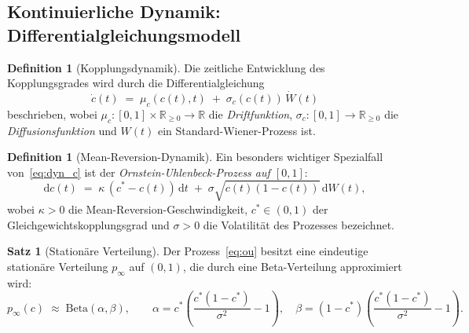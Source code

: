 \documentclass[a4paper, 12pt, twoside, openright]{report}
\theoremstyle{definition}
\newtheorem{definition}[theorem]{Definition}
\theoremstyle{definition}
\newtheorem{satz}{Satz}[chapter]
\begin{document}
\subsection{Kontinuierliche Dynamik: Differentialgleichungsmodell}

\begin{definition}[Kopplungsdynamik]
\label{def:kopplungsDyn}
    Die zeitliche Entwicklung des Kopplungsgrades wird durch die
    Differentialgleichung
    \begin{equation}
    \label{eq:dyn_c}
        \dot{c}(t) \;=\; \mu_c(c(t), t) \;+\; \sigma_c(c(t))\,\dot{W}(t)
    \end{equation}
    beschrieben, wobei $\mu_c : [0,1] \times \mathbb{R}_{\geq 0} \to \mathbb{R}$
    die \emph{Driftfunktion}, $\sigma_c : [0,1] \to \mathbb{R}_{\geq 0}$
    die \emph{Diffusionsfunktion} und $W(t)$ ein Standard-Wiener-Prozess ist.
\end{definition}

\begin{definition}[Mean-Reversion-Dynamik]
\label{def:meanRev}
    Ein besonders wichtiger Spezialfall von~\eqref{eq:dyn_c} ist der
    \emph{Ornstein-Uhlenbeck-Prozess auf $[0,1]$}:
    \begin{equation}
    \label{eq:ou}
        \mathrm{d}c(t) \;=\; \kappa\,(c^* - c(t))\,\mathrm{d}t
        \;+\; \sigma\sqrt{c(t)(1-c(t))}\,\mathrm{d}W(t),
    \end{equation}
    wobei $\kappa > 0$ die Mean-Reversion-Geschwindigkeit,
    $c^* \in (0,1)$ der Gleichgewichtskopplungsgrad und
    $\sigma > 0$ die Volatilität des Prozesses bezeichnet.
\end{definition}

\begin{satz}[Stationäre Verteilung]
\label{satz:stationaer}
    Der Prozess~\eqref{eq:ou} besitzt eine eindeutige stationäre
    Verteilung $p_\infty$ auf $(0,1)$, die durch eine Beta-Verteilung
    approximiert wird:
    \[
        p_\infty(c) \;\approx\; \mathrm{Beta}(\alpha, \beta), \qquad
        \alpha = c^* \!\left(\frac{c^*(1-c^*)}{\sigma^2} - 1\right), \quad
        \beta = (1-c^*)\!\left(\frac{c^*(1-c^*)}{\sigma^2} - 1\right).
    \]
\end{satz}
\end{document}

